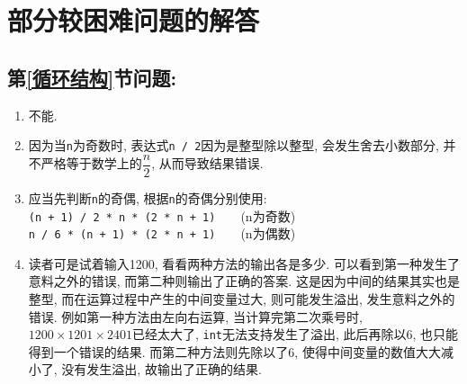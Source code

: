 \chapter{部分较困难问题的解答} \label{部分较困难问题的解答}

    \section{第\ref{循环结构}节问题: } \label{平方和公式答案}
    \begin{enumerate}
        \item 不能.
        \item 因为当\texttt{n}为奇数时, 表达式\texttt{n / 2}因为是整型除以整型, 会发生舍去小数部分, 并不严格等于数学上的$\dfrac{n}{2}$, 从而导致结果错误.
        \item 应当先判断\texttt{n}的奇偶, 根据\texttt{n}的奇偶分别使用: \\
              \texttt{(n + 1) / 2 * n * (2 * n + 1)}~~~~(n为奇数) \\
              \texttt{n / 6 * (n + 1) * (2 * n + 1)}~~~~(n为偶数)
        \item 读者可是试着输入1200, 看看两种方法的输出各是多少. 可以看到第一种发生了意料之外的错误, 而第二种则输出了正确的答案. 这是因为中间的结果其实也是整型, 而在运算过程中产生的中间变量过大, 则可能发生溢出, 发生意料之外的错误. 例如第一种方法由左向右运算, 当计算完第二次乘号时, $1200 \times 1201 \times 2401$已经太大了, \texttt{int}无法支持发生了溢出, 此后再除以6, 也只能得到一个错误的结果. 而第二种方法则先除以了6, 使得中间变量的数值大大减小了, 没有发生溢出, 故输出了正确的结果.
    \end{enumerate}